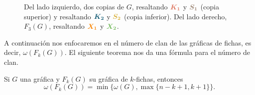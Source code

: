 \begin{figure}[ht!]
\caption{Del lado izquierdo, dos copias de $G$, resaltando
${\color{salmon}\boldsymbol {K_1}}$ y ${\color{baige}\boldsymbol {S_1}}$ (copia
superior) y resaltando ${\color{azulOscuro}\boldsymbol {K_2}}$ y
${\color{oro}\boldsymbol {S_2}}$ (copia inferior). Del lado derecho, $F_3(G)$,
resaltando ${\color{naranja}\boldsymbol {X_1}}$ y ${\color{verde}\boldsymbol
{X_2}}$.}
\label{fig:ex-clique2}
\end{figure}
       
A continuaci\'on nos enfocaremos en el n\'umero de clan de las gr\'aficas de
fichas, es decir, $\omega(F_k(G))$. El siguiente teorema nos da una f\'ormula
para el n\'umero de clan.
            
\begin{teorema}
\label{teo:clan-max}
    Si $G$ una gr\'afica y $F_k(G)$ su gr\'afica de $k$-fichas, entonces
    \[
    \omega(F_k(G))= \min \{\omega(G), \max \{n-k+1,k+1\}\}.
    \]
\end{teorema}

